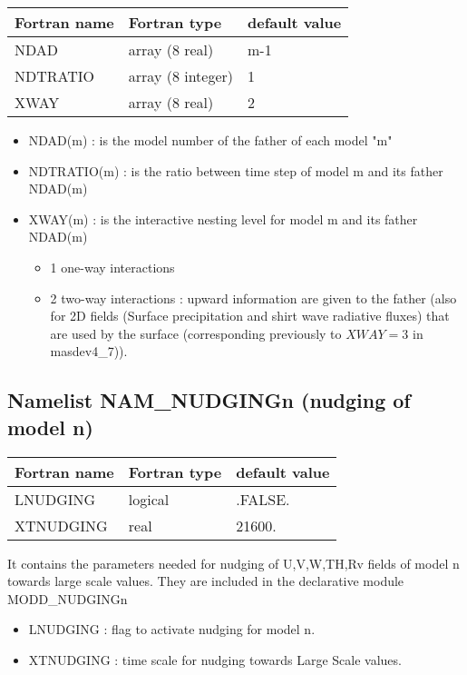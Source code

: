 \begin{center}
\begin{tabular} {|l|l|l|}
\hline
Fortran name & Fortran type & default value \\
\hline
NDAD  &  array (8 real) &  m-1   \\
NDTRATIO & array (8 integer) & 1 \\
XWAY & array (8 real) & 2 \\
\hline
\end{tabular}
\end{center}

\begin{itemize}
\item
{}  
NDAD(m) : is the model number of the father of each model "m"
\item
{}
NDTRATIO(m) : is the ratio between time step of model m and its father NDAD(m)
\item
{} 
XWAY(m) : is the interactive nesting level for model m and its father NDAD(m)
\begin{itemize}
\item 1 one-way interactions
\item 2 two-way interactions : upward information are given to the father (also for 2D fields (Surface precipitation and
shirt wave radiative fluxes) that are used by the surface (corresponding previously to $XWAY=3$ in masdev4\_7)). 
\end{itemize}
\end{itemize}
\subsection{Namelist NAM\_NUDGINGn (nudging of model n)}

\begin{center}
\begin{tabular} {|l|l|l|}
\hline
Fortran name & Fortran type & default value \\
\hline
LNUDGING   &  logical & .FALSE. \\
XTNUDGING  &  real    &  21600. \\
\hline
\end{tabular}
\end{center}

It contains the parameters needed for nudging of U,V,W,TH,Rv fields of model n
towards large scale values. They are
included in the declarative module MODD\_NUDGINGn
\begin{itemize}
\item
{}
LNUDGING : flag to activate nudging for model n.
\item
{}
XTNUDGING : time scale for nudging towards Large Scale values.
\end{itemize}
